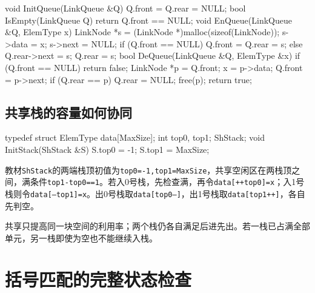 \par\medskip\noindent\begin{minipage}{\linewidth}
\begin{codeblock}[language=C++]
void InitQueue(LinkQueue &Q) {
    Q.front = Q.rear = NULL;
}
bool IsEmpty(LinkQueue Q) { return Q.front == NULL; }
void EnQueue(LinkQueue &Q, ElemType x) {
    LinkNode *s = (LinkNode *)malloc(sizeof(LinkNode));
    s->data = x;
    s->next = NULL;
    if (Q.front == NULL)
        Q.front = Q.rear = s;
    else {
        Q.rear->next = s;
        Q.rear = s;
    }
}
bool DeQueue(LinkQueue &Q, ElemType &x) {
    if (Q.front == NULL) return false;
    LinkNode *p = Q.front;
    x = p->data;
    Q.front = p->next;
    if (Q.rear == p) Q.rear = NULL;
    free(p);
    return true;
}
\end{codeblock}
\end{minipage}\par\medskip

\subsection{共享栈的容量如何协同}\label{DS03-share-code}

\par\medskip\noindent\begin{minipage}{\linewidth}
\begin{codeblock}[language=C++]
typedef struct {
    ElemType data[MaxSize];
    int top0, top1;
} ShStack;
void InitStack(ShStack &S) {
    S.top0 = -1;
    S.top1 = MaxSize;
}
\end{codeblock}
\end{minipage}\par\medskip

教材\texttt{ShStack}的两端栈顶初值为\texttt{top0=\allowbreak{}-1,\allowbreak{}top1=\allowbreak{}MaxSize}，共享空闲区在两栈顶之间，满条件\texttt{top1-top0=\allowbreak{}=\allowbreak{}1}。若入0号栈，先检查满，再令\texttt{data[\allowbreak{}+\allowbreak{}+\allowbreak{}top0]\allowbreak{}=\allowbreak{}x}；入1号栈则令\texttt{data[\allowbreak{}--top1]\allowbreak{}=\allowbreak{}x}。出0号栈取\texttt{data[\allowbreak{}top0--]\allowbreak{}}，出1号栈取\texttt{data[\allowbreak{}top1+\allowbreak{}+\allowbreak{}]\allowbreak{}}，各自先判空。

共享只提高同一块空间的利用率；两个栈仍各自满足后进先出。若一栈已占满全部单元，另一栈即使为空也不能继续入栈。

\section{括号匹配的完整状态检查}\label{DS03-bracket-code}

